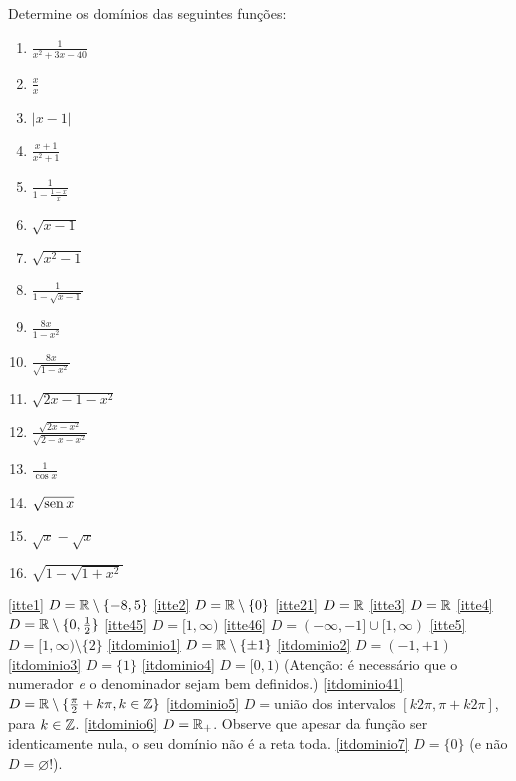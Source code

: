 \begin{exo}
Determine os domínios das seguintes funções:
\begin{multicols}{4}
\begin{enumerate}
\item\label{itte1} $\frac{1}{x^2+3x-40}$
\item\label{itte2} $\frac{x}{x}$
\item\label{itte21} $|x-1|$
\item\label{itte3} $\frac{x+1}{x^2+1}$
\item\label{itte4} $\frac{1}{1-\frac{1-x}{x}}$
\item\label{itte45} $\sqrt{x-1}$
\item\label{itte46} $\sqrt{x^2-1}$
\item\label{itte5} $\frac{1}{1-\sqrt{x-1}}$
\item\label{itdominio1} $\frac{8x}{1-x^2}$
\item\label{itdominio2} $\frac{8x}{\sqrt{1-x^2}}$
\item\label{itdominio3} $\sqrt{2x-1-x^2}$
\item\label{itdominio4} $\frac{\sqrt{2x-x^2}}{\sqrt{2-x-x^2}}$
\item\label{itdominio41} $\frac{1}{\cos x}$
\item\label{itdominio5} $\sqrt{{\operatorname{sen} x}}$
\item\label{itdominio6} $\sqrt{x}-\sqrt{x}$
\item\label{itdominio7} $\sqrt{1-\sqrt{1+x^2}}$
\end{enumerate}
\end{multicols}
\vspace{0.01cm}
\begin{sol}
\eqref{itte1} $D=\mathbb{R}\setminus\{-8,5\}$ 
\eqref{itte2} $D=\mathbb{R}\setminus\{0\}$ 
\eqref{itte21} $D=\mathbb{R}$
\eqref{itte3} $D=\mathbb{R}$ 
\eqref{itte4} $D=\mathbb{R}\setminus\{0,\tfrac12\}$ 
\eqref{itte45} $D=[1,\infty)$
\eqref{itte46} $D=(-\infty,-1]\cup [1,\infty)$ 
\eqref{itte5} $D=[1,\infty ) \setminus \{2\}$
\eqref{itdominio1} $D=\mathbb{R}\setminus\{\pm 1\}$
\eqref{itdominio2} $D=(-1,+1)$
\eqref{itdominio3} $D=\{1\}$
 \eqref{itdominio4} $D=[0,1)$ (Atenção: é necessário que o numerador \emph{e} o
denominador sejam bem definidos.)
\eqref{itdominio41} $D=\mathbb{R}\setminus \{\tfrac{\pi}{2}+k\pi, k\in \mathbb{Z}\}$ 
\eqref{itdominio5} $D=$união dos intervalos $[k2\pi,\pi +k2\pi]$, para $k\in \mathbb{Z}$.
 \eqref{itdominio6} $D=\mathbb{R}_+$. Observe que apesar da função ser identicamente nula, o seu
domínio não é a reta toda.
\eqref{itdominio7} $D=\{0\}$ (e não $D=\varnothing$!).
\end{sol}
\end{exo}

